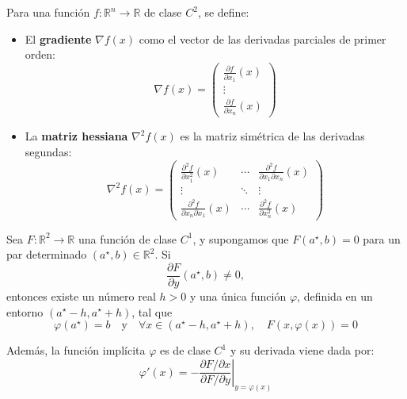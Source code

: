 \begin{f}
	Para una función \( f : \mathbb{R}^n \rightarrow \mathbb{R} \) de clase \( C^2 \), se define:
	
	\begin{itemize}
		\item El \textbf{gradiente} \( \nabla f(x) \) como el vector de las derivadas parciales de primer orden:
		\[
		\nabla f(x) = 
		\begin{pmatrix}
			\frac{\partial f}{\partial x_1}(x) \\
			\vdots \\
			\frac{\partial f}{\partial x_n}(x)
		\end{pmatrix}
		\]
		
		\item La \textbf{matriz hessiana} \( \nabla^2 f(x) \) es la matriz simétrica de las derivadas segundas:
		\[
		\nabla^2 f(x) =
		\begin{pmatrix}
			\frac{\partial^2 f}{\partial x_1^2}(x) & \cdots & \frac{\partial^2 f}{\partial x_1 \partial x_n}(x) \\
			\vdots & \ddots & \vdots \\
			\frac{\partial^2 f}{\partial x_n \partial x_1}(x) & \cdots & \frac{\partial^2 f}{\partial x_n^2}(x)
		\end{pmatrix}
		\]
	\end{itemize}
	
\end{f}

\begin{f}
	Sea \( F : \mathbb{R}^2 \rightarrow \mathbb{R} \) una función de clase \( C^1 \), y supongamos que \( F(a^\star, b) = 0 \) para un par determinado \( (a^\star, b) \in \mathbb{R}^2 \). Si
	\[
	\frac{\partial F}{\partial y}(a^\star, b) \neq 0,
	\]
	entonces existe un número real \( h > 0 \) y una única función \( \varphi \), definida en un entorno \( (a^\star - h, a^\star + h) \), tal que
	\[
	\varphi(a^\star) = b \quad \text{y} \quad \forall x \in (a^\star - h, a^\star + h), \quad F(x, \varphi(x)) = 0
	\]
	
	Además, la función implícita \( \varphi \) es de clase \( C^1 \) y su derivada viene dada por:
	\[
	\varphi'(x) = - \left. \frac{\partial F / \partial x}{\partial F / \partial y} \right|_{y = \varphi(x)}
	\]
	
	
\end{f}
